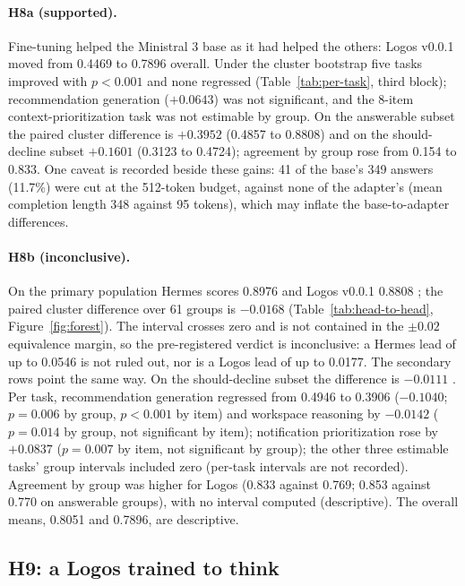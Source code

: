 \paragraph{H8a (supported).} Fine-tuning helped the Ministral 3 base as it had helped the others: Logos v0.0.1 moved from 0.4469  to 0.7896  overall. Under the cluster bootstrap five tasks improved with $p<0.001$ and none regressed (Table~\ref{tab:per-task}, third block); recommendation generation ($+0.0643$) was not significant, and the 8-item context-prioritization task was not estimable by group. On the answerable subset the paired cluster difference is $+0.3952$  (0.4857 to 0.8808) and on the should-decline subset $+0.1601$  (0.3123 to 0.4724); agreement by group rose from 0.154 to 0.833. One caveat is recorded beside these gains: 41 of the base's 349 answers (11.7\%) were cut at the 512-token budget, against none of the adapter's (mean completion length 348 against 95 tokens), which may inflate the base-to-adapter differences.

\paragraph{H8b (inconclusive).} On the primary population Hermes scores 0.8976  and Logos v0.0.1 0.8808 ; the paired cluster difference over 61 groups is $-0.0168$  (Table~\ref{tab:head-to-head}, Figure~\ref{fig:forest}). The interval crosses zero and is not contained in the $\pm 0.02$ equivalence margin, so the pre-registered verdict is inconclusive: a Hermes lead of up to 0.0546 is not ruled out, nor is a Logos lead of up to 0.0177. The secondary rows point the same way. On the should-decline subset the difference is $-0.0111$ . Per task, recommendation generation regressed from 0.4946 to 0.3906 ($-0.1040$; $p = 0.006$ by group, $p<0.001$ by item) and workspace reasoning by $-0.0142$ ($p = 0.014$ by group, not significant by item); notification prioritization rose by $+0.0837$ ($p = 0.007$ by item, not significant by group); the other three estimable tasks' group intervals included zero (per-task intervals are not recorded). Agreement by group was higher for Logos (0.833 against 0.769; 0.853 against 0.770 on answerable groups), with no interval computed (descriptive). The overall means, 0.8051 and 0.7896, are descriptive.

\subsection{H9: a Logos trained to think}
